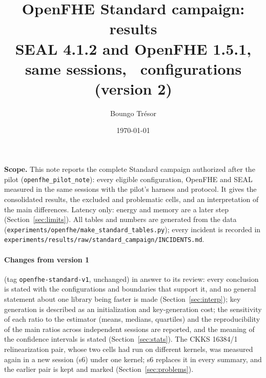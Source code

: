 \documentclass[11pt]{article}
\title{OpenFHE Standard campaign: results\\[2pt]
\large SEAL 4.1.2 and OpenFHE 1.5.1, same sessions, \nConfigs\ configurations\\ (version 2)}
\author{Boungo Tr\'esor}
\date{\today}
\begin{document}
\maketitle

\noindent\textbf{Scope.} This note reports the complete Standard campaign authorized after the pilot (\texttt{openfhe\_pilot\_note}): every eligible configuration, OpenFHE and SEAL measured in the same sessions with the pilot's harness and protocol. It gives the consolidated results, the excluded and problematic cells, and an interpretation of the main differences. Latency only: energy and memory are a later step (Section~\ref{sec:limits}). All tables and numbers are generated from the data (\texttt{experiments/openfhe/make\_standard\_tables.py}); every incident is recorded in \texttt{experiments/results/raw/standard\_campaign/INCIDENTS.md}.

\paragraph{Changes from version 1} (tag \texttt{openfhe-standard-v1}, unchanged) in answer to its review: every conclusion is stated with the configurations and boundaries that support it, and no general statement about one library being faster is made (Section~\ref{sec:interp}); key generation is described as an initialization and key-generation cost; the sensitivity of each ratio to the estimator (means, medians, quartiles) and the reproducibility of the main ratios across independent sessions are reported, and the meaning of the confidence intervals is stated (Section~\ref{sec:stats}). The CKKS 16384/1 relinearization pair, whose two cells had run on different kernels, was measured again in a new session (s6) under one kernel; s6 replaces it in every summary, and the earlier pair is kept and marked (Section~\ref{sec:problems}).
\end{document}
